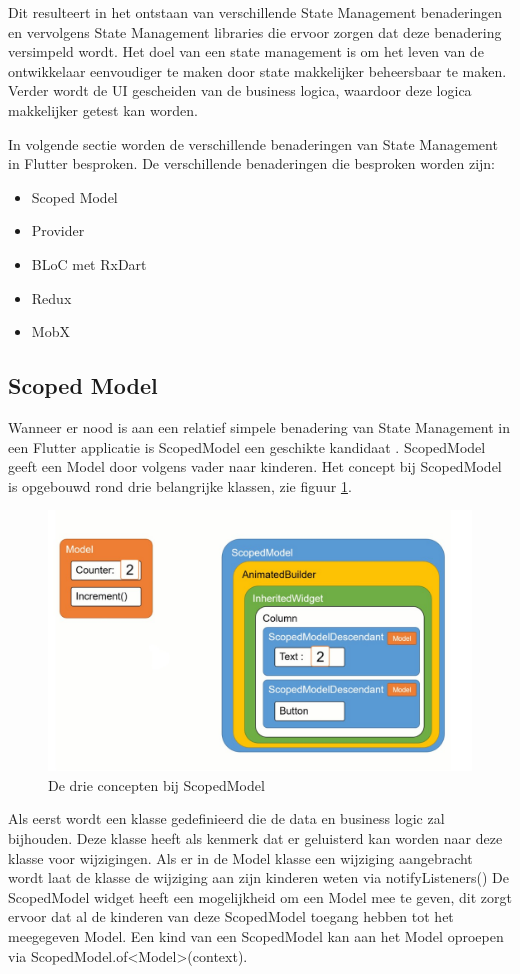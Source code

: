 Dit resulteert in het ontstaan van verschillende State Management benaderingen en vervolgens State Management libraries die ervoor zorgen dat deze benadering versimpeld wordt.
Het doel van een state management is om het leven van de ontwikkelaar eenvoudiger te
maken door state makkelijker beheersbaar te maken. Verder wordt de UI gescheiden van
de business logica, waardoor deze logica makkelijker getest kan worden. \textcite{Coninck2019}

In volgende sectie worden de verschillende benaderingen van State Management in Flutter besproken.
De verschillende benaderingen die besproken worden zijn: 
\begin{itemize}
    \item Scoped Model
    \item Provider
    \item BLoC met RxDart
    \item Redux
    \item MobX
\end{itemize}

\subsection{Scoped Model}
Wanneer er nood is aan een relatief simpele benadering van State Management in een Flutter applicatie is ScopedModel een geschikte kandidaat \autocite{Boelens2019}. ScopedModel geeft een Model door volgens vader naar kinderen. Het concept bij ScopedModel is opgebouwd rond drie belangrijke klassen, zie figuur \ref{fig:scopedmodel}. 

\begin{figure}[H]
    \includegraphics[width=\linewidth]{img/stand-van-zaken/scopedmodel.jpg}
    \caption{De drie concepten bij ScopedModel \autocite{Boelens2019}}
    \label{fig:scopedmodel}
\end{figure}
Als eerst wordt een klasse gedefinieerd die de 
data en business logic zal bijhouden. Deze klasse heeft als kenmerk dat er geluisterd kan worden naar deze klasse voor wijzigingen. Als er in de Model klasse een wijziging aangebracht wordt laat de klasse de wijziging aan zijn kinderen weten via notifyListeners()
De ScopedModel widget heeft een mogelijkheid om een Model mee te geven, dit zorgt ervoor dat al de kinderen van deze ScopedModel toegang hebben tot het meegegeven Model. Een kind van een ScopedModel kan aan het Model oproepen via ScopedModel.of<Model>(context).

